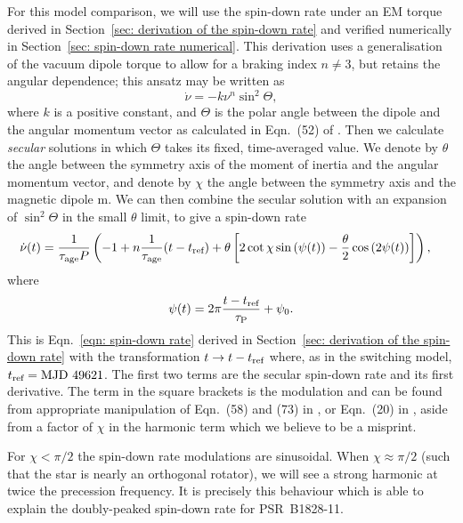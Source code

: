 \documentclass[../full_thesis/full_thesis.tex]{subfiles}
\begin{document}
For this model comparison, we will use the spin-down rate under an EM torque
derived in Section~\ref{sec: derivation of the spin-down rate} and verified
numerically in Section~\ref{sec: spin-down rate numerical}. This derivation uses a
generalisation of the vacuum dipole torque to
allow for a braking index $n\ne3$, but retains the angular dependence; this
ansatz may be written as
\begin{equation}
\dot{\nu} = -k\nu^{n}\sin^{2}\Theta,
\end{equation}
where $k$ is a positive constant, and $\Theta$ is the
polar angle between the dipole and the angular momentum vector
as calculated in Eqn.~(52) of \citet{Jones2001}.
Then we calculate \emph{secular} solutions in which $\Theta$ takes its fixed, time-averaged
value. We denote by $\theta$  the angle between the symmetry axis of the
moment of inertia and the angular momentum vector, and denote by $\chi$ the
angle between the symmetry axis and the magnetic dipole m.  We can then combine
the secular solution with an expansion of $\sin^2 \Theta$ in the small
$\theta$ limit, to give a spin-down rate
\begin{align}
\begin{split}
\dot{\nu}(t) = \frac{1}{\tau_{\mathrm{age}} P}&\left(-1 + n\frac{1}{\tau_{\mathrm{age}}} (t-t_{\textrm{ref}})
 + \theta \left[
2\cot\chi\sin\left(\psi(t)\right) - \frac{\theta}{2}\cos\left(2\psi(t)\right)
\right]\right),
\end{split}
\label{eqn: precession nudot degen}
\end{align}
where
\begin{equation}
\psi(t)= 2\pi\frac{t-t_{\textrm{ref}}}{\tau_{\mathrm{P}}} + \psi_{0}.
\end{equation}
This is Eqn.~\ref{eqn: spin-down rate} derived in Section~\ref{sec: derivation of
the spin-down rate} with the transformation $t \rightarrow t-t_{\textrm{ref}}$ where,
as in the switching model, $t_{\textrm{ref}}= \textrm{MJD } 49621$.
The first two terms are the secular spin-down rate and its first derivative.
The term in the square brackets is the modulation and can be found from appropriate
manipulation of Eqn.~(58) and (73) in \citet{Jones2001}, or Eqn.~(20) in
\citet{Link2001}, aside from a factor of $\chi$ in the harmonic term which we
believe to be a misprint.

For $\chi < \pi/2$ the spin-down rate modulations are sinusoidal. When $\chi
\approx \pi/2$ (such that the star is nearly an orthogonal rotator), we will
see a strong harmonic at twice the precession frequency. It is precisely this
behaviour which is able to explain the doubly-peaked spin-down rate for
PSR~B1828-11.
\end{document}
